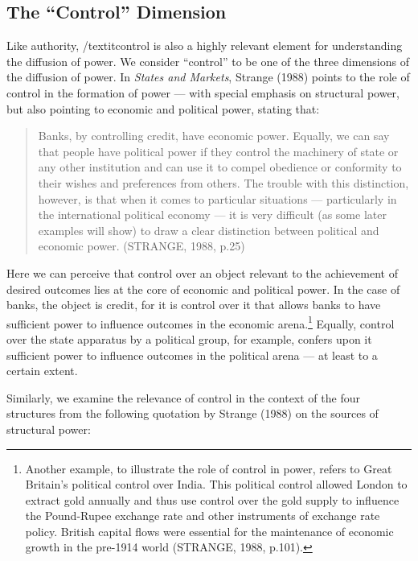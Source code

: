 \subsection{The ``Control'' Dimension}

Like authority, /textit{control} is also a highly relevant element for understanding the diffusion of power. We consider ``control'' to be one of the three dimensions of the diffusion of power. In \textit{States and Markets}, Strange (1988) points to the role of control in the formation of power --- with special emphasis on structural power, but also pointing to economic and political power, stating that:

\begin{quote}
Banks, by controlling credit, have economic power. Equally, we can say that people have political power if they control the machinery of state or any other institution and can use it to compel obedience or conformity to their wishes and preferences from others. The trouble with this distinction, however, is that when it comes to particular situations --- particularly in the international political economy --- it is very difficult (as some later examples will show) to draw a clear distinction between political and economic power. (STRANGE, 1988, p.25)
\end{quote}

Here we can perceive that control over an object relevant to the achievement of desired outcomes lies at the core of economic and political power. In the case of banks, the object is credit, for it is control over it that allows banks to have sufficient power to influence outcomes in the economic arena.\footnote{Another example, to illustrate the role of control in power, refers to Great Britain's political control over India. This political control allowed London to extract gold annually and thus use control over the gold supply to influence the Pound-Rupee exchange rate and other instruments of exchange rate policy. British capital flows were essential for the maintenance of economic growth in the pre-1914 world (STRANGE, 1988, p.101).} Equally, control over the state apparatus by a political group, for example, confers upon it sufficient power to influence outcomes in the political arena --- at least to a certain extent.

Similarly, we examine the relevance of control in the context of the four structures from the following quotation by Strange (1988) on the sources of structural power:

